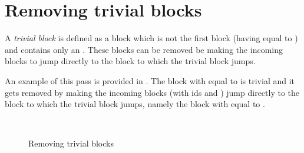 \section{Removing trivial blocks}

A \textit{trivial block} is defined as a block which is not the first block (having  equal to ) and
contains only an . These blocks can be removed be making the incoming blocks to jump
directly to the block to which the trivial block jumps.

An example of this pass is provided in . The block with  equal to
 is trivial and it gets removed by making the incoming blocks (with ids  and ) jump directly to
the block to which the trivial block jumps, namely the block with  equal to .

\begin{figure}[htb]
    \\
    \caption{Removing trivial blocks \label{img:remove-trivial}}
\end{figure}